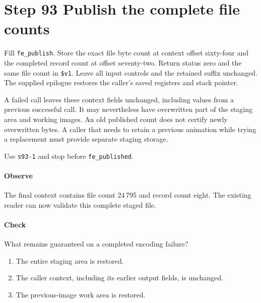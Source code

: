 \section{Step 93 Publish the complete file counts}
Fill \texttt{fe\_publish}. Store the exact file byte count at context offset sixty-four and the completed record count at offset seventy-two. Return status zero and the same file count in \texttt{\$v1}. Leave all input controls and the retained suffix unchanged. The supplied epilogue restores the caller's saved registers and stack pointer.

A failed call leaves these context fields unchanged, including values from a previous successful call. It may nevertheless have overwritten part of the staging area and working images. An old published count does not certify newly overwritten bytes. A caller that needs to retain a previous animation while trying a replacement must provide separate staging storage.

Use \texttt{s93-1} and stop before \texttt{fe\_published}.

\paragraph{Observe} The final context contains file count 24\,795 and record count eight. The existing reader can now validate this complete staged file.

\paragraph{Check} What remains guaranteed on a completed encoding failure?
\begin{enumerate}[label=\Alph*.]
\item The entire staging area is restored.
\item The caller context, including its earlier output fields, is unchanged.
\item The previous-image work area is restored.
\end{enumerate}
